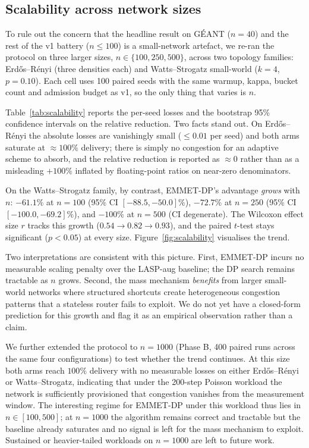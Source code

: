 \subsection{Scalability across network sizes}
\label{subsec:scalability}

To rule out the concern that the headline result on GÉANT ($n=40$) and
the rest of the v1 battery ($n \le 100$) is a small-network artefact,
we re-ran the protocol on three larger sizes, $n \in \{100, 250, 500\}$,
across two topology families: Erd\H{o}s--R\'enyi (three densities each)
and Watts--Strogatz small-world ($k=4$, $p=0.10$). Each cell uses 100
paired seeds with the same warmup, kappa, bucket count and admission
budget as v1, so the only thing that varies is $n$.

Table~\ref{tab:scalability} reports the per-seed losses and the
bootstrap 95\% confidence intervals on the relative reduction. Two
facts stand out. On Erd\H{o}s--R\'enyi the absolute losses are
vanishingly small ($\le 0.01$ per seed) and both arms saturate at
$\approx 100\%$ delivery; there is simply no congestion for an
adaptive scheme to absorb, and the relative reduction is reported
as $\approx 0$ rather than as a misleading $+100\%$ inflated by
floating-point ratios on near-zero denominators.

On the Watts--Strogatz family, by contrast, EMMET-DP's advantage
\emph{grows} with $n$: $-61.1\%$ at $n=100$ (95\% CI $[-88.5, -50.0]\%$),
$-72.7\%$ at $n=250$ (95\% CI $[-100.0, -69.2]\%$), and $-100\%$ at
$n=500$ (CI degenerate). The Wilcoxon effect size $r$ tracks this
growth ($0.54 \to 0.82 \to 0.93$), and the paired $t$-test stays
significant ($p < 0.05$) at every size. Figure~\ref{fig:scalability}
visualises the trend.

Two interpretations are consistent with this picture. First, EMMET-DP
incurs no measurable scaling penalty over the LASP-aug baseline; the
DP search remains tractable as $n$ grows. Second, the mass mechanism
\emph{benefits} from larger small-world networks where structured
shortcuts create heterogeneous congestion patterns that a stateless
router fails to exploit. We do not yet have a closed-form prediction
for this growth and flag it as an empirical observation rather than
a claim.

We further extended the protocol to $n=1000$ (Phase B, 400 paired
runs across the same four configurations) to test whether the trend
continues. At this size both arms reach $100\%$ delivery with no
measurable losses on either Erd\H{o}s--R\'enyi or Watts--Strogatz,
indicating that under the 200-step Poisson workload the network is
sufficiently provisioned that congestion vanishes from the measurement
window. The interesting regime for EMMET-DP under this workload
thus lies in $n \in [100, 500]$; at $n=1000$ the algorithm remains
correct and tractable but the baseline already saturates and no
signal is left for the mass mechanism to exploit. Sustained or
heavier-tailed workloads on $n=1000$ are left to future work.

